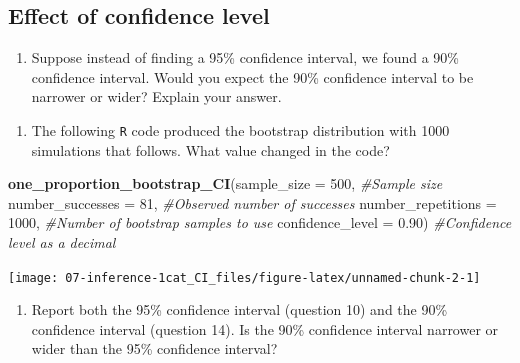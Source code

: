 \documentclass[
]{report}
\newenvironment{Shaded}{\begin{snugshade}}{\end{snugshade}}
\newcommand{\CommentTok}[1]{\textcolor[rgb]{0.56,0.35,0.01}{\textit{#1}}}
\newcommand{\DataTypeTok}[1]{\textcolor[rgb]{0.13,0.29,0.53}{#1}}
\newcommand{\DecValTok}[1]{\textcolor[rgb]{0.00,0.00,0.81}{#1}}
\newcommand{\FloatTok}[1]{\textcolor[rgb]{0.00,0.00,0.81}{#1}}
\newcommand{\KeywordTok}[1]{\textcolor[rgb]{0.13,0.29,0.53}{\textbf{#1}}}
\newcommand{\NormalTok}[1]{#1}
\providecommand{\tightlist}{%
  \setlength{\itemsep}{0pt}\setlength{\parskip}{0pt}}
\begin{document}
\vspace{1in}

\newpage

\hypertarget{effect-of-confidence-level}{%
\subsection{Effect of confidence level}\label{effect-of-confidence-level}}

\begin{enumerate}
\def\labelenumi{\arabic{enumi}.}
\setcounter{enumi}{12}
\tightlist
\item
  Suppose instead of finding a 95\% confidence interval, we found a 90\% confidence interval. Would you expect the 90\% confidence interval to be narrower or wider? Explain your answer.
\end{enumerate}

\vspace{0.5in}

\begin{enumerate}
\def\labelenumi{\arabic{enumi}.}
\setcounter{enumi}{13}
\tightlist
\item
  The following \texttt{R} code produced the bootstrap distribution with 1000 simulations that follows. What value changed in the code?
\end{enumerate}

\begin{Shaded}
\begin{Highlighting}[]
\KeywordTok{one\_proportion\_bootstrap\_CI}\NormalTok{(}\DataTypeTok{sample\_size =} \DecValTok{500}\NormalTok{, }\CommentTok{\#Sample size}
                    \DataTypeTok{number\_successes =} \DecValTok{81}\NormalTok{, }\CommentTok{\#Observed number of successes}
                    \DataTypeTok{number\_repetitions =} \DecValTok{1000}\NormalTok{, }\CommentTok{\#Number of bootstrap samples to use}
                    \DataTypeTok{confidence\_level =} \FloatTok{0.90}\NormalTok{) }\CommentTok{\#Confidence level as a decimal}
\end{Highlighting}
\end{Shaded}

\begin{center}\texttt{[image: 07-inference-1cat\_CI\_files/figure-latex/unnamed-chunk-2-1]} \end{center}

\vspace{0.5in}

\begin{enumerate}
\def\labelenumi{\arabic{enumi}.}
\setcounter{enumi}{14}
\tightlist
\item
  Report both the 95\% confidence interval (question 10) and the 90\% confidence interval (question 14). Is the 90\% confidence interval narrower or wider than the 95\% confidence interval?
\end{enumerate}
\end{document}
